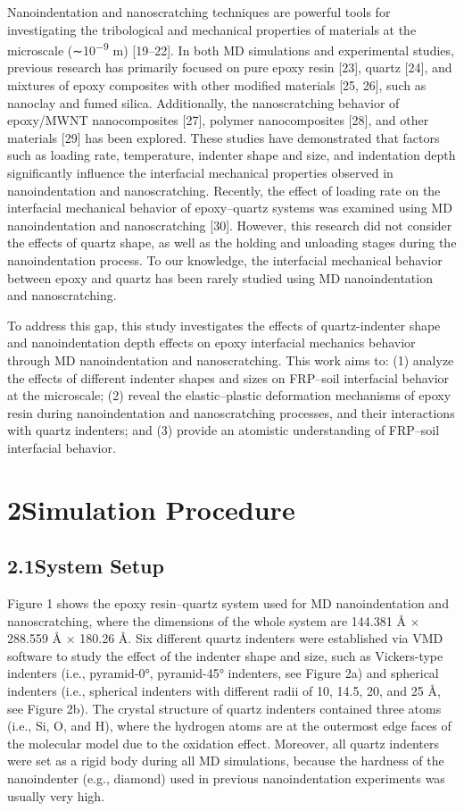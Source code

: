 \documentclass{article}
\begin{document}
Nanoindentation and nanoscratching techniques are powerful tools for investigating the tribological and mechanical properties of materials at the microscale (∼10\textsuperscript{−9} m) [19–22]. In both MD simulations and experimental studies, previous research has primarily focused on pure epoxy resin [23], quartz [24], and mixtures of epoxy composites with other modified materials [25, 26], such as nanoclay and fumed silica. Additionally, the nanoscratching behavior of epoxy/MWNT nanocomposites [27], polymer nanocomposites [28], and other materials [29] has been explored. These studies have demonstrated that factors such as loading rate, temperature, indenter shape and size, and indentation depth significantly influence the interfacial mechanical properties observed in nanoindentation and nanoscratching. Recently, the effect of loading rate on the interfacial mechanical behavior of epoxy–quartz systems was examined using MD nanoindentation and nanoscratching [30]. However, this research did not consider the effects of quartz shape, as well as the holding and unloading stages during the nanoindentation process. To our knowledge, the interfacial mechanical behavior between epoxy and quartz has been rarely studied using MD nanoindentation and nanoscratching.

To address this gap, this study investigates the effects of quartz-indenter shape and nanoindentation depth effects on epoxy interfacial mechanics behavior through MD nanoindentation and nanoscratching. This work aims to: (1) analyze the effects of different indenter shapes and sizes on FRP–soil interfacial behavior at the microscale; (2) reveal the elastic–plastic deformation mechanisms of epoxy resin during nanoindentation and nanoscratching processes, and their interactions with quartz indenters; and (3) provide an atomistic understanding of FRP–soil interfacial behavior.

\section*{2\quad Simulation Procedure}

\subsection*{2.1\quad System Setup}

Figure 1 shows the epoxy resin–quartz system used for MD nanoindentation and nanoscratching, where the dimensions of the whole system are 144.381 Å × 288.559 Å × 180.26 Å. Six different quartz indenters were established via VMD software to study the effect of the indenter shape and size, such as Vickers-type indenters (i.e., pyramid-0°, pyramid-45° indenters, see Figure 2a) and spherical indenters (i.e., spherical indenters with different radii of 10, 14.5, 20, and 25 Å, see Figure 2b). The crystal structure of quartz indenters contained three atoms (i.e., Si, O, and H), where the hydrogen atoms are at the outermost edge faces of the molecular model due to the oxidation effect. Moreover, all quartz indenters were set as a rigid body during all MD simulations, because the hardness of the nanoindenter (e.g., diamond) used in previous nanoindentation experiments was usually very high.
\end{document}
